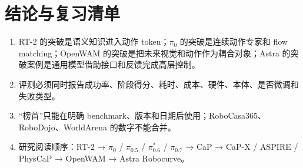 \documentclass[UTF8,a4paper,11pt]{ctexart}
\begin{document}
\section{结论与复习清单}
\begin{enumerate}
\item RT-2 的突破是语义知识进入动作 token；$\pi_0$ 的突破是连续动作专家和 flow matching；OpenWAM 的突破是把未来视觉和动作作为耦合对象；Astra 的突破案例是通用模型借助接口和反馈完成高层控制。
\item 评测必须同时报告成功率、阶段得分、耗时、成本、硬件、本体、是否微调和失败类型。
\item “榜首”只能在明确 benchmark、版本和日期后使用；RoboCasa365、RoboDojo、WorldArena 的数字不能合并。
\item 研究阅读顺序：RT-2 → $\pi_0$ / $\pi_{0.5}$ / $\pi^*_{0.6}$ / $\pi_{0.7}$ → CaP → CaP-X / ASPIRE / PhysCaP → OpenWAM → Astra Robocurve。
\end{enumerate}


\nocite{*}


\end{document}
